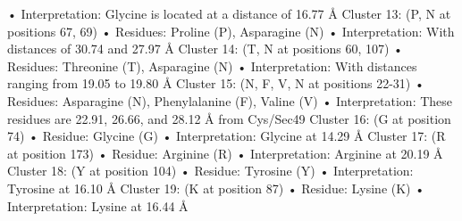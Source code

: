 \documentclass{article}
\begin{document}
    • Interpretation: Glycine is located at a distance of 16.77 Å
Cluster 13: (P, N at positions 67, 69)
    • Residues: Proline (P), Asparagine (N)
    • Interpretation: With distances of 30.74 and 27.97 Å
Cluster 14: (T, N at positions 60, 107)
    • Residues: Threonine (T), Asparagine (N)
    • Interpretation: With distances ranging from 19.05 to 19.80 Å
Cluster 15: (N, F, V, N at positions 22-31)
    • Residues: Asparagine (N), Phenylalanine (F), Valine (V)
    • Interpretation: These residues are 22.91, 26.66, and 28.12 Å from Cys/Sec49
Cluster 16: (G at position 74)
    • Residue: Glycine (G)
    • Interpretation: Glycine at 14.29 Å 
Cluster 17: (R at position 173)
    • Residue: Arginine (R)
    • Interpretation: Arginine at 20.19 Å 
Cluster 18: (Y at position 104)
    • Residue: Tyrosine (Y)
    • Interpretation: Tyrosine at 16.10 Å 
Cluster 19: (K at position 87)
    • Residue: Lysine (K)
    • Interpretation: Lysine at 16.44 Å 
\end{document}
